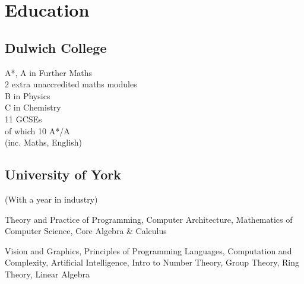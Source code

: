 \documentclass[a4paper]{cv}
\begin{document}
\begin{minipage}[t]{0.66\textwidth}
\sectionspace %

\end{minipage} %

\begin{minipage}[t]{0.8\textwidth}\centering


\section{Education} 

\begin{minipage}[t]{0.4\textwidth}
\subsection{Dulwich College}

A*, A in Further Maths \\
2 extra unaccredited maths modules \\
B in Physics \\
C in Chemistry \\\vspace{4pt}
11 GCSEs \\
of which 10 A*/A \\
(inc. Maths, English)

\end{minipage}
\begin{minipage}[t]{0.55\textwidth}
\subsection{University of York}

(With a year in industry) \\\vspace{4pt}

Theory and Practice of Programming,
Computer Architecture,
Mathematics of Computer Science,
Core Algebra \& Calculus \\\vspace{4pt}

Vision and Graphics,
Principles of Programming Languages,
Computation and Complexity,
Artificial Intelligence,
Intro to Number Theory,
Group Theory,
Ring Theory,
Linear Algebra \\\vspace{4pt}


\end{minipage}
\end{minipage}
\end{document}
